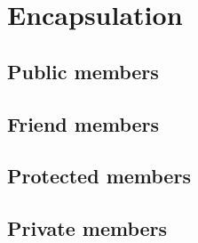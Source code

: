 \documentclass{KodeBook}
\begin{document}
	\chapter{Encapsulation}
\fi


\section{Public members}


\section{Friend members}


\section{Protected members}


\section{Private members}




\ifx\wholebook\relax\else
% 
% 
	
\end{document}
